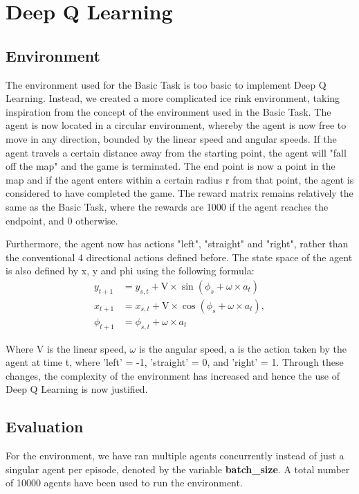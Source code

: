 \renewcommand{\thesection}{Advanced Task}
\section{Deep Q Learning}
\subsection{Environment}
The environment used for the Basic Task is too basic to implement Deep Q Learning. Instead, we created a more complicated ice rink environment, taking inspiration from the concept of the environment used in the Basic Task. The agent is now located in a circular environment, whereby the agent is now free to move in any direction, bounded by the linear speed and angular speeds.  If the agent travels a certain distance away from the starting point, the agent will "fall off the map" and the game is terminated. The end point is now a point in the map and if the agent enters within a certain radius r from that point, the agent is considered to have completed the game. The reward matrix remains relatively the same as the Basic Task, where the rewards are 1000 if the agent reaches the endpoint, and 0 otherwise.

Furthermore, the agent now has actions "left", "straight" and "right", rather than the conventional 4 directional actions defined before. The state space of the agent is also defined by x, y and phi using the following formula:
\begin{align}
    y_{t+1} &= y_{s,t} + \text{V} \times \sin(\phi_s + \omega \times a_t) \label{something} \\
    x_{t+1} &= x_{s,t} + \text{V} \times \cos(\phi_s + \omega \times a_t), \\
    \phi_{t+1} &= \phi_{s,t} + \omega \times a_t
\end{align}

Where V is the linear speed, $\omega$ is the angular speed, a is the action taken by the agent at time t, where 'left' = -1, 'straight' = 0, and 'right' = 1. Through these changes, the complexity of the environment has increased and hence the use of Deep Q Learning is now justified.

\subsection{Evaluation}
For the environment, we have ran multiple agents concurrently instead of just a singular agent per episode, denoted by the variable \textbf{batch\_size}. A total number of 10000 agents have been used to run the environment. 

